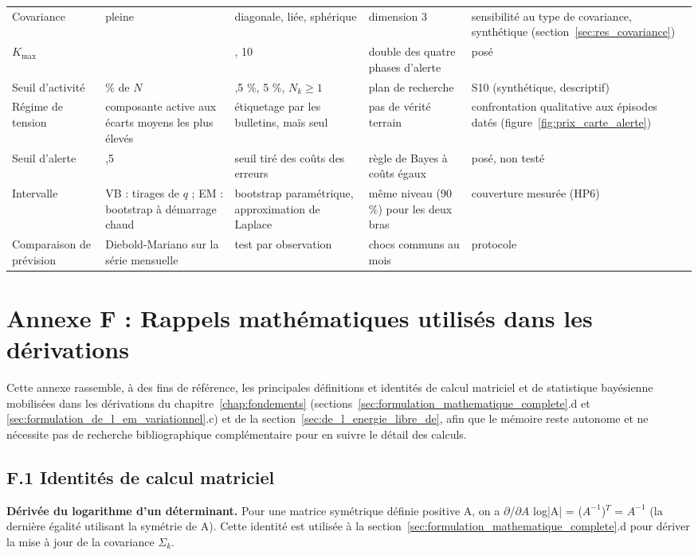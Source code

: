 {\begin{longtable}{>{\raggedright\arraybackslash}p{1.9cm}>{\raggedright\arraybackslash}p{2.9cm}>{\raggedright\arraybackslash}p{2.9cm}>{\raggedright\arraybackslash}p{3.9cm}>{\raggedright\arraybackslash}p{3.0cm}}
Covariance & pleine & diagonale, liée, sphérique & dimension 3 & sensibilité au type de covariance, synthétique (section~\ref{sec:res_covariance}) \\
$K_{\max}$ & 8 & 6, 10 & double des quatre phases d'alerte & posé \\
Seuil d'activité & 1 \% de $N$ & 0,5 \%, 5 \%, $N_k \geq 1$ & plan de recherche & S10 (synthétique, descriptif) \\
Régime de tension & composante active aux écarts moyens les plus élevés & étiquetage par les bulletins, maïs seul & pas de vérité terrain & confrontation qualitative aux épisodes datés (figure~\ref{fig:prix_carte_alerte}) \\
Seuil d'alerte & 0,5 & seuil tiré des coûts des erreurs & règle de Bayes à coûts égaux & posé, non testé \\
Intervalle & VB : tirages de $q$ ; EM : bootstrap à démarrage chaud & bootstrap paramétrique, approximation de Laplace & même niveau (90 \%) pour les deux bras & couverture mesurée (HP6) \\
Comparaison de prévision & Diebold-Mariano sur la série mensuelle & test par observation & chocs communs au mois & protocole \\
\end{longtable}
}

\section*{Annexe F : Rappels mathématiques utilisés dans les dérivations}
Cette annexe rassemble, à des fins de référence, les principales définitions et identités de calcul matriciel et de statistique bayésienne mobilisées dans les dérivations du chapitre~\ref{chap:fondements} (sections~\ref{sec:formulation_mathematique_complete}.d et \ref{sec:formulation_de_l_em_variationnel}.c) et de la section~\ref{sec:de_l_energie_libre_de}, afin que le mémoire reste autonome et ne nécessite pas de recherche bibliographique complémentaire pour en suivre le détail des calculs.

\subsection*{F.1 Identités de calcul matriciel}
\textbf{Dérivée du logarithme d'un déterminant. }Pour une matrice symétrique définie positive A, on a $\partial $/$\partial A$ log|A| = ($A^{-1}$)$^{T}$ = $A^{-1}$ (la dernière égalité utilisant la symétrie de A). Cette identité est utilisée à la section~\ref{sec:formulation_mathematique_complete}.d pour dériver la mise à jour de la covariance $\Sigma _{k}$.

